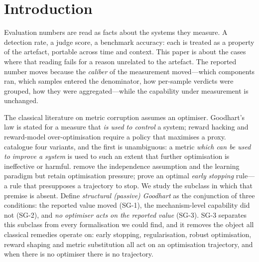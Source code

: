 \documentclass{article}
\begin{document}
\begin{abstract}
We instantiate the framework on a C/C++ verification apparatus ($1{,}147$ samples) and, partially, on
LLM-as-a-judge evaluation (migration score $55.8/100$; $78.3/100$ once the aggregation axis is probed the
way the transfer criterion prescribes, which shows the published reading to be a test-design false
negative). All numbers come from frozen artifacts of earlier batches; no new measurement was taken for this
paper.
\end{abstract}

\section{Introduction}
\label{sec:intro}

Evaluation numbers are read as facts about the systems they measure. A detection rate, a judge score, a
benchmark accuracy: each is treated as a property of the artefact, portable across time and context. This
paper is about the cases where that reading fails for a reason unrelated to the artefact. The reported
number moves because the \emph{caliber} of the measurement moved---which components ran, which samples
entered the denominator, how per-sample verdicts were grouped, how they were aggregated---while the
capability under measurement is unchanged.

The classical literature on metric corruption assumes an optimiser. Goodhart's law
\citep{goodhart1975problems,strathern1997improving} is stated for a measure that \emph{is used to control} a
system; reward hacking \citep{skalse2022rewardhacking,amodei2016concrete} and reward-model over-optimisation
\citep{gao2023scaling} require a policy that maximises a proxy. \citet{manheim2018categorizing} catalogue
four variants, and the first is unambiguous: a metric \emph{which can be used to improve a system} is used
to such an extent that further optimisation is ineffective or harmful. \citet{majka2025goodhart} remove the
independence assumption and the learning paradigm but retain optimisation pressure; \citet{karwowski2023goodhart}
prove an optimal \emph{early stopping} rule---a rule that presupposes a trajectory to stop. We study the
subclass in which that premise is absent. Define \emph{structural (passive) Goodhart} as the conjunction of
three conditions: the reported value moved (SG-1), the mechanism-level capability did not (SG-2), and
\emph{no optimiser acts on the reported value} (SG-3). SG-3 separates this subclass from every formalisation
we could find, and it removes the object all classical remedies operate on: early stopping, regularisation,
robust optimisation, reward shaping and metric substitution all act on an optimisation trajectory, and when
there is no optimiser there is no trajectory.
\end{document}
